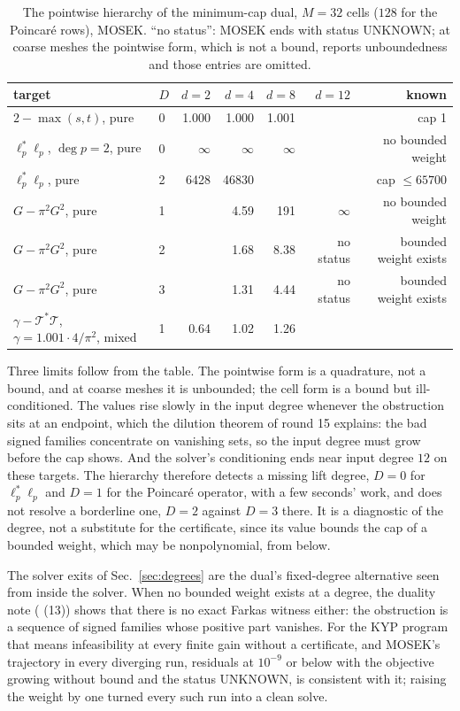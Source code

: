 \documentclass[12pt]{article}
\newcommand{\mcl}[1]{\mathcal{#1}}
\newcommand{\file}[1]{\path{#1}}      %
\theoremstyle{plain}
\theoremstyle{definition}
\theoremstyle{remark}
\begin{document}
\begin{table}[h]\centering\footnotesize
\setlength{\tabcolsep}{5pt}
\begin{tabular}{llrrrrr}
\toprule
target & $D$ & $d=2$ & $d=4$ & $d=8$ & $d=12$ & known \\
\midrule
$2-\max(s,t)$, pure & 0 & 1.000 & 1.000 & 1.001 & & cap 1 \\
$\ell_p^*\ell_p$, $\deg p=2$, pure & 0 & $\infty$ & $\infty$ & $\infty$ & & no bounded weight \\
$\ell_p^*\ell_p$, pure & 2 & 6428 & 46830 & & & cap $\le65700$ \\
$G-\pi^2G^2$, pure & 1 & & 4.59 & 191 & $\infty$ & no bounded weight \\
$G-\pi^2G^2$, pure & 2 & & 1.68 & 8.38 & no status & bounded weight exists \\
$G-\pi^2G^2$, pure & 3 & & 1.31 & 4.44 & no status & bounded weight exists \\
$\gamma-\mcl T^*\mcl T$, $\gamma=1.001\cdot4/\pi^2$, mixed & 1 & 0.64 & 1.02 & 1.26 & & \\
\bottomrule
\end{tabular}
\caption{The pointwise hierarchy of the minimum-cap dual, $M=32$ cells ($128$ for the Poincar\'e rows), MOSEK. ``no status'': MOSEK ends with status UNKNOWN; at coarse meshes the pointwise form, which is not a bound, reports unboundedness and those entries are omitted.}\label{tab:mincap}
\end{table}

Three limits follow from the table. The pointwise form is a quadrature, not a bound, and at coarse meshes it is unbounded; the cell form is a bound but ill-conditioned. The values rise slowly in the input degree whenever the obstruction sits at an endpoint, which the dilution theorem of round 15 explains: the bad signed families concentrate on vanishing sets, so the input degree must grow before the cap shows. And the solver's conditioning ends near input degree $12$ on these targets. The hierarchy therefore detects a missing lift degree, $D=0$ for $\ell_p^*\ell_p$ and $D=1$ for the Poincar\'e operator, with a few seconds' work, and does not resolve a borderline one, $D=2$ against $D=3$ there. It is a diagnostic of the degree, not a substitute for the certificate, since its value bounds the cap of a bounded weight, which may be nonpolynomial, from below.

The solver exits of Sec.~\ref{sec:degrees} are the dual's fixed-degree alternative seen from inside the solver. When no bounded weight exists at a degree, the duality note (\file{bounded\_gram\_duality.md} (13)) shows that there is no exact Farkas witness either: the obstruction is a sequence of signed families whose positive part vanishes. For the KYP program that means infeasibility at every finite gain without a certificate, and MOSEK's trajectory in every diverging run, residuals at $10^{-9}$ or below with the objective growing without bound and the status UNKNOWN, is consistent with it; raising the weight by one turned every such run into a clean solve.
\end{document}
